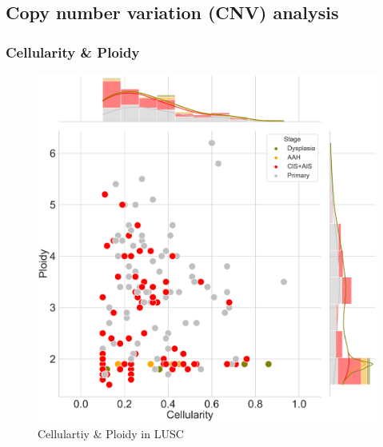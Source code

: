 \documentclass{beamer}
\begin{document}
        \subsection{Copy number variation (CNV) analysis}
            \begin{frame}
                \frametitle{Cellularity \& Ploidy}

                \begin{figure}
                    \includegraphics[width=0.4 \linewidth]{figures/Sequenza/BWA-sequenza-SQC.pdf}
                    \caption{Cellulartiy \& Ploidy in LUSC}
                \end{figure}
            \end{frame}
\end{document}
